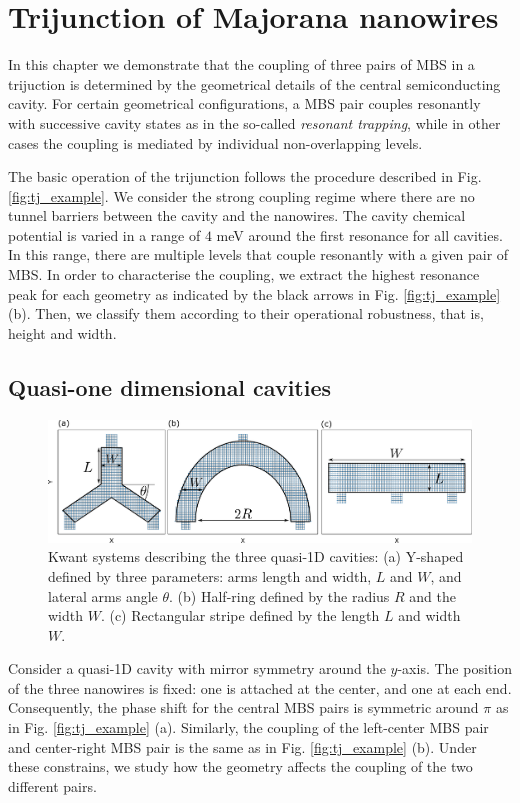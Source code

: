 \chapter{Trijunction of Majorana nanowires}

In this chapter we demonstrate that the coupling of three pairs of MBS in a trijuction is determined by the geometrical details of the central semiconducting cavity.
For certain geometrical configurations, a MBS pair couples resonantly with successive cavity states as in the so-called \textit{resonant trapping}, while in other cases the coupling is mediated by individual non-overlapping levels.

The basic operation of the trijunction follows the procedure described in Fig. \ref{fig:tj_example}.
We consider the strong coupling regime where there are no tunnel barriers between the cavity and the nanowires.
The cavity chemical potential is varied in a range of $4$ meV around the first resonance for all cavities.
In this range, there are multiple levels that couple resonantly with a given pair of MBS.
In order to characterise the coupling, we extract the highest resonance peak for each geometry as indicated by the black arrows in Fig. \ref{fig:tj_example} (b).
Then, we classify them according to their operational robustness, that is, height and width.

\section{Quasi-one dimensional cavities}

\begin{figure}[h!]
\centering
  \includegraphics[width=0.9\linewidth]{figures/1d_cavities.pdf}
  \caption{Kwant systems describing the three quasi-1D cavities: (a) Y-shaped defined by three parameters: arms length and width, $L$ and $W$, and lateral arms angle $\theta$. (b) Half-ring defined by the radius $R$ and the width $W$. (c) Rectangular stripe defined by the length $L$ and width $W$.}
  \label{fig:1d}
\end{figure}

Consider a quasi-1D cavity with mirror symmetry around the $y$-axis.
The position of the three nanowires is fixed: one is attached at the center, and one at each end.
Consequently, the phase shift for the central MBS pairs is symmetric around $\pi$ as in Fig. \ref{fig:tj_example} (a).
Similarly, the coupling of the left-center MBS pair and center-right MBS pair is the same as in Fig. \ref{fig:tj_example} (b).
Under these constrains, we study how the geometry affects the coupling of the two different pairs.

